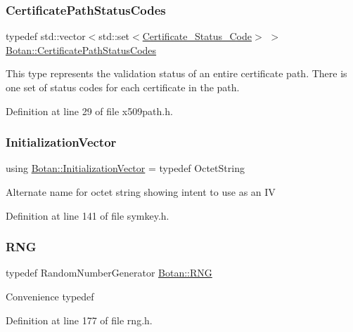 \subsubsection{\texorpdfstring{Certificate\+Path\+Status\+Codes}{CertificatePathStatusCodes}}
{\footnotesize\ttfamily typedef std\+::vector$<$std\+::set$<$\mbox{\hyperlink{namespace_botan_ae1e907dc90937bdda30f65216e68ff2b}{Certificate\+\_\+\+Status\+\_\+\+Code}}$>$ $>$ \mbox{\hyperlink{namespace_botan_a013252aabcb201e0d27b60b1e690886b}{Botan\+::\+Certificate\+Path\+Status\+Codes}}}

This type represents the validation status of an entire certificate path. There is one set of status codes for each certificate in the path. 

Definition at line 29 of file x509path.\+h.

\mbox{\label{namespace_botan_a2fbf5195ffe701adcabb1f8c41bfc557}} 
\subsubsection{\texorpdfstring{Initialization\+Vector}{InitializationVector}}
{\footnotesize\ttfamily using \mbox{\hyperlink{namespace_botan_a2fbf5195ffe701adcabb1f8c41bfc557}{Botan\+::\+Initialization\+Vector}} = typedef Octet\+String}

Alternate name for octet string showing intent to use as an IV 

Definition at line 141 of file symkey.\+h.

\mbox{\label{namespace_botan_a45fbc8259840830135e2cf779839ddfa}} 
\subsubsection{\texorpdfstring{R\+NG}{RNG}}
{\footnotesize\ttfamily typedef Random\+Number\+Generator \mbox{\hyperlink{namespace_botan_a45fbc8259840830135e2cf779839ddfa}{Botan\+::\+R\+NG}}}

Convenience typedef 

Definition at line 177 of file rng.\+h.

\mbox{\label{namespace_botan_a89cf6c3513428f524454d01830221a88}} 
